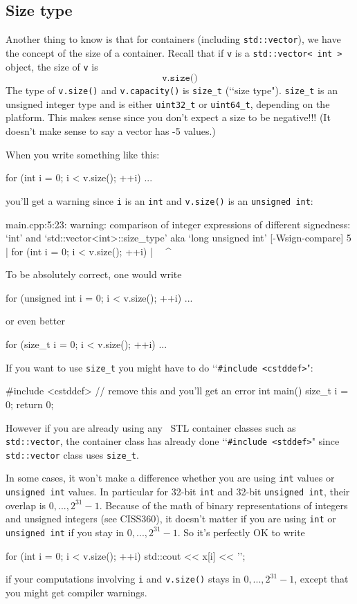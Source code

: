 \subsection{Size type}

Another thing to know is that
for containers (including \verb!std::vector!),
we have the concept of the size of a container.
Recall that if \verb!v! is a \verb!std::vector< int >! object,
the size of \verb!v! is
\[
\texttt{v.size()}
\]
The type of \verb!v.size()! and \verb!v.capacity()!
is \verb!size_t! (\lq\lq size type").
\verb!size_t! is an unsigned integer type and is
either \verb!uint32_t! or \verb!uint64_t!,
depending on the platform.
This makes sense since you don't expect a size to be negative!!!
(It doesn't make sense to say a vector has -5 values.)

When you write something like this:
\begin{console}[fontsize=\footnotesize]
for (int i = 0; i < v.size(); ++i)
{
    ...  
}
\end{console}
you'll get a warning since \verb!i! is an \verb!int!
and \verb!v.size()! is an \verb!unsigned int!:
\begin{console}[fontsize=\footnotesize]
main.cpp:5:23: warning: comparison of integer expressions of different
signedness: ‘int’ and ‘std::vector<int>::size_type’ {aka ‘long unsigned
int’} [-Wsign-compare]
    5 |     for (int i = 0; i < v.size(); ++i)
      |                     ~~^~~~~~~~~~
\end{console}
To be absolutely correct, one would write
\begin{console}[fontsize=\footnotesize]
for (unsigned int i = 0; i < v.size(); ++i)
{
    ...  
}
\end{console}
or even better
\begin{console}[fontsize=\footnotesize]
for (size_t i = 0; i < v.size(); ++i)
{
    ...  
}
\end{console}
If you want to use \verb!size_t!
you might have to do \lq\lq\verb!#include <cstddef>!":
\begin{console}[fontsize=\footnotesize]
#include <cstddef> // remove this and you'll get an error
int main()
{
    size_t i = 0;
    return 0;
}
\end{console}
However if you are already using any \cpp\ STL container classes such as
\verb!std::vector!, the container class has already done
\lq\lq\verb!#include <stddef>!" since \verb!std::vector! class uses
\verb!size_t!.

In some cases,
it won't make a difference whether you are using \verb!int! values
or \verb!unsigned int! values.
In particular for 32-bit \verb!int! and 32-bit \verb!unsigned int!,
their overlap is $0,...,2^{31}-1$.
Because of the math of binary representations of integers and
unsigned integers (see CISS360),
it doesn't matter if you are using \verb!int! or \verb!unsigned int!
if you stay in $0,...,2^{31}-1$.
So it's perfectly OK to write
\begin{console}[fontsize=\footnotesize]
for (int i = 0; i < v.size(); ++i)
{
    std::cout << x[i] << '\n';
}
\end{console}
if your computations involving \verb!i! and \verb!v.size()! stays
in $0,...,2^{31}-1$, except that you might get compiler warnings.

